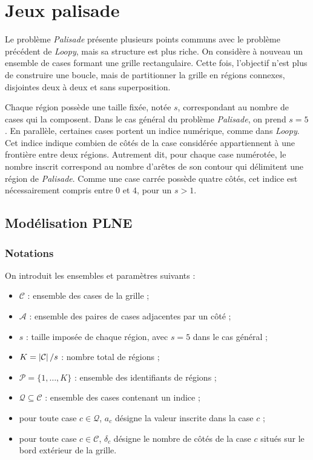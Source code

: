 \section{Jeux palisade}

Le problème \textit{Palisade} présente plusieurs points communs avec le 
problème précédent de \textit{Loopy}, mais sa structure est plus riche. 
On considère à nouveau un ensemble de cases formant une grille rectangulaire. 
Cette fois, l'objectif n'est plus de construire une boucle, mais de partitionner la grille en régions connexes, 
disjointes deux à deux et sans superposition.

Chaque région possède une taille fixée, notée \(s\), correspondant au nombre de cases qui la composent. 
Dans le cas général du problème \textit{Palisade}, on prend \(s = 5\). En parallèle, certaines cases portent un 
indice numérique, comme dans \textit{Loopy}. Cet indice indique combien de côtés de la case considérée appartiennent 
à une frontière entre deux régions. Autrement dit, pour chaque case numérotée, le nombre inscrit correspond au nombre 
d'arêtes de son contour qui délimitent une région de \textit{Palisade}. Comme une case carrée possède quatre côtés, 
cet indice est nécessairement compris entre \(0\) et \(4\), pour un $s > 1$.

\subsection{Modélisation PLNE}

\subsubsection{Notations}

On introduit les ensembles et paramètres suivants :

\begin{itemize}
    \item \(\mathcal{C}\) : ensemble des cases de la grille ;
    \item \(\mathcal{A}\) : ensemble des paires de cases adjacentes par un côté ;
    \item \(s\) : taille imposée de chaque région, avec \(s = 5\) dans le cas général ;
    \item \(K = \left|\mathcal{C}\right|/s\) : nombre total de régions ;
    \item \(\mathcal{P} = \{1, \dots, K\}\) : ensemble des identifiants de régions ;
    \item \(\mathcal{Q} \subseteq \mathcal{C}\) : ensemble des cases contenant un indice ;
    \item pour toute case \(c \in \mathcal{Q}\), \(a_c\) désigne la valeur inscrite dans la case \(c\) ;
    \item pour toute case \(c \in \mathcal{C}\), \(\delta_c\) désigne le nombre de côtés de la case \(c\) situés sur le bord extérieur de la grille.
\end{itemize}

